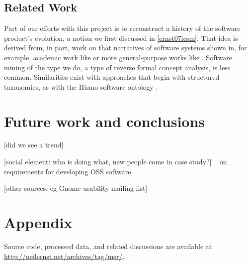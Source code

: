 \documentclass[conference, compsoc]{IEEEtran}
\begin{document}
\subsection{Related Work}
Part of our efforts with this project is to reconstruct a history of the software product's evolution, a notion we first discussed in \ref{ernst07icsm}. That idea is derived from, in part, work on that narratives of software systems shown in, for example, academic work like \cite{Anton2001} or more general-purpose works like \cite{box93c++}. Software mining of the type we do, a type of reverse formal concept analysis, is less common. Similarities exist with approaches that begin with structured taxonomies, as with the Hismo software ontology \cite{Girba2006}.

\section{Future work and conclusions}
[did we see a trend]

[social element: who is doing what, new people come in case study?] ~\cite{Scacchi2002} on requirements for developing OSS software.

[other sources, eg Gnome usability mailing list] %
\section{Appendix}
Source code, processed data, and related discussions are available at \url{http://neilernst.net/archives/tag/msr/}.
\begin{footnotesize}

\end{footnotesize}
\end{document}
